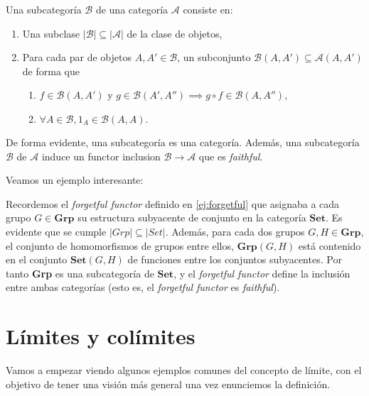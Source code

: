 \begin{definicion}
    Una subcategoría $\mathscr{B}$ de una categoría $\mathscr{A}$ consiste en:
    \begin{enumerate}
        \item Una subclase $|\mathscr{B}| \subseteq |\mathscr{A}|$ de la clase de objetos,
        \item Para cada par de objetos $A,A' \in \mathscr{B}$, un subconjunto $\mathscr{B}(A,A') \subseteq \mathscr{A}(A,A')$ de forma que 
        \begin{enumerate}
            \item $f \in \mathscr{B}(A,A')$ y $g \in \mathscr{B}(A',A'') \implies g \circ f \in \mathscr{B}(A,A''),$ 
            \item $\forall A \in \mathscr{B}, 1_{A} \in \mathscr{B}(A,A).$
        \end{enumerate}

    \end{enumerate}
    De forma evidente, una subcategoría es una categoría. Además, una subcategoría $\mathscr{B}$ de $\mathscr{A}$ induce un functor inclusion $\mathscr{B} \longrightarrow \mathscr{A}$ que es \textit{faithful}.
\end{definicion}

Veamos un ejemplo interesante:
\begin{ejemplo}
    Recordemos el \textit{forgetful functor} definido en \ref{ej:forgetful} que asignaba a cada grupo $G \in \textbf{Grp}$ su estructura subyacente de conjunto en la categoría $\textbf{Set}$. Es evidente que se cumple $|Grp| \subseteq |Set|$. Además, para cada dos grupos $G, H \in \textbf{Grp}$, el conjunto de homomorfismos de grupos entre ellos, $\textbf{Grp}(G,H)$ está contenido en el conjunto $\textbf{Set}(G,H)$ de funciones entre los conjuntos subyacentes. Por tanto \textbf{Grp} es una subcategoría de $\textbf{Set}$, y el \textit{forgetful functor} define la inclusión entre ambas categorías (esto es, el \textit{forgetful functor} es \textit{faithful}).
\end{ejemplo}

\section{Límites y colímites}

Vamos a empezar viendo algunos ejemplos comunes del concepto de límite, con el objetivo de tener una visión más general una vez enunciemos la definición.


